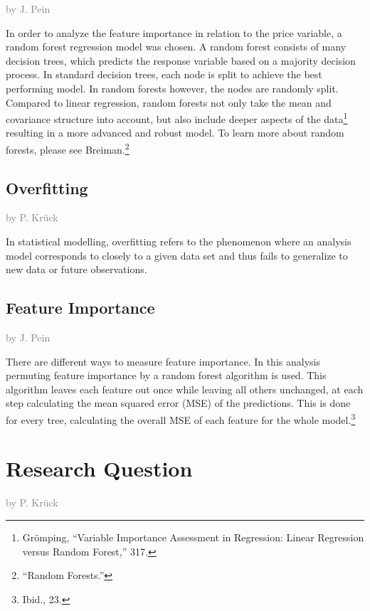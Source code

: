 \documentclass[a4paper, nobind]{templates/ociamthesis}
\begin{document}
\textcolor{gray}{by J. Pein}

In order to analyze the feature importance in relation to the price variable, a random forest regression model was chosen. A random forest consists of many decision trees, which predicts the response variable based on a majority decision process. In standard decision trees, each node is split to achieve the best performing model. In random forests however, the nodes are randomly split.
Compared to linear regression, random forests not only take the mean and covariance structure into account, but also include deeper aspects of the data\footnote{Grömping, ``Variable Importance Assessment in Regression: Linear Regression versus Random Forest,'' 317.} resulting in a more advanced and robust model. To learn more about random forests, please see Breiman.\footnote{``Random Forests.''}

\hypertarget{overfitting}{%
\subsection{Overfitting}\label{overfitting}}

\textcolor{gray}{by P. Krück}

In statistical modelling, overfitting refers to the phenomenon where an analysis model corresponds to closely to a given data set and thus fails to generalize to new data or future observations.

\hypertarget{feature-importance}{%
\subsection{Feature Importance}\label{feature-importance}}

\textcolor{gray}{by J. Pein}

There are different ways to measure feature importance. In this analysis permuting feature importance by a random forest algorithm is used. This algorithm leaves each feature out once while leaving all others unchanged, at each step calculating the mean squared error (MSE) of the predictions. This is done for every tree, calculating the overall MSE of each feature for the whole model.\footnote{Ibid., 23.}

\hypertarget{research-question}{%
\section{Research Question}\label{research-question}}

\textcolor{gray}{by P. Krück}
\end{document}
